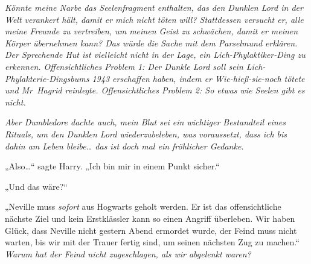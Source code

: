 \emph{Könnte meine \emph{Narbe} das Seelenfragment enthalten, das den Dunklen Lord in der Welt verankert hält, damit er mich nicht töten will? Stattdessen versucht er, alle meine Freunde zu vertreiben, um meinen Geist zu schwächen, damit er meinen Körper übernehmen kann? Das würde die Sache mit dem Parselmund erklären. Der Sprechende Hut ist vielleicht nicht in der Lage, ein Lich-Phylaktiker-Ding zu erkennen. Offensichtliches Problem 1: Der Dunkle Lord soll sein Lich-Phylakterie-Dingsbums 1943 erschaffen haben, indem er Wie-hieß-sie-noch tötete und Mr~Hagrid reinlegte. Offensichtliches Problem 2: So etwas wie Seelen gibt es nicht.}

\emph{Aber Dumbledore dachte auch, mein Blut sei ein wichtiger Bestandteil eines Rituals, um den Dunklen Lord wiederzubeleben, was voraussetzt, dass ich bis dahin am Leben bleibe… das ist doch mal ein fröhlicher Gedanke.}

„Also…“ sagte Harry. „Ich bin mir in einem Punkt sicher.“

„Und das wäre?“

„Neville muss \emph{sofort} aus Hogwarts geholt werden. Er ist das offensichtliche nächste Ziel und kein Erstklässler kann so einen Angriff überleben. Wir haben Glück, dass Neville nicht gestern Abend ermordet wurde, der Feind muss nicht warten, bis wir mit der Trauer fertig sind, um seinen nächsten Zug zu machen.“
\emph{Warum hat der Feind nicht zugeschlagen, als wir abgelenkt waren?}

